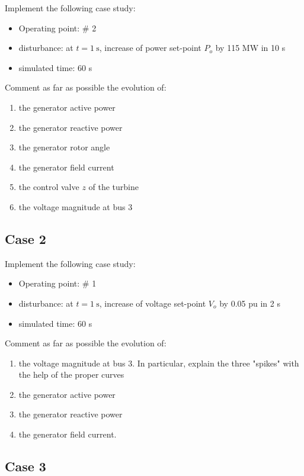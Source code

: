 \documentclass[a4paper,11pt,oneside,onecolumn]{article}
\begin{document}
Implement the following case study:
\begin{itemize}
\item  Operating point: \# 2
\item  disturbance: at $t=1 \mathrm{~s}$, increase of power set-point $P_o$ by 115 MW in 10 s
\item  simulated time: 60 s
\end{itemize}

\noindent Comment as far as possible the evolution of:
\begin{enumerate}
\item  the generator active power
\item   the generator reactive power
\item   the generator rotor angle
\item   the generator field current
\item   the control valve $z$ of the turbine
\item   the voltage magnitude at bus 3
\end{enumerate}

\subsection{Case 2}

Implement the following case study:
\begin{itemize}
\item  Operating point: \# 1
\item  disturbance: at $t=1 \mathrm{~s}$, increase of voltage set-point $V_o$ by 0.05 pu in 2 s
\item simulated time: 60 s
\end{itemize}

\noindent Comment as far as possible the evolution of:
\begin{enumerate}
\item the voltage magnitude at bus 3. In particular, explain the three "spikes" with the help of the proper curves
\item the generator active power
\item the generator reactive power
\item the generator field current.
\end{enumerate}

\subsection{Case 3}
\end{document}
